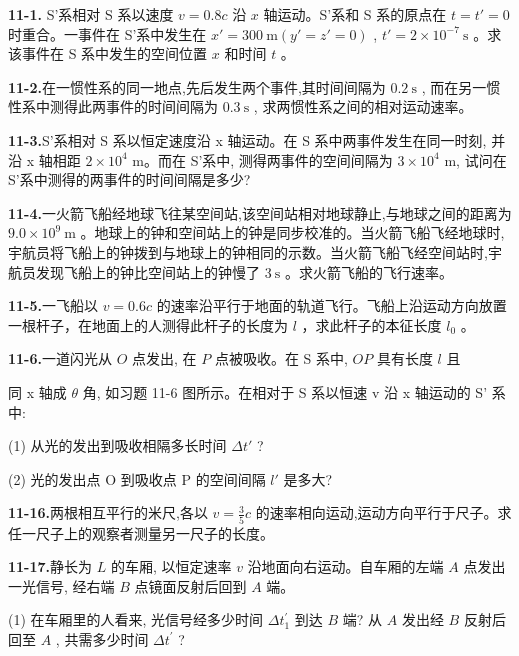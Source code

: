 \textbf{11-1.} S'系相对 S 系以速度 $v = 0.8c$ 沿 $x$ 轴运动。S'系和 S 系的原点在 $t = t' = 0$ 时重合。一事件在 S'系中发生在 $x' = 300 \mathrm{~m} (y' = z' = 0)$ , $t' = 2 \times 10^{-7} \mathrm{~s}$ 。求该事件在 S 系中发生的空间位置 $x$ 和时间 $t$ 。

\vfill

\textbf{11-2.}在一惯性系的同一地点,先后发生两个事件,其时间间隔为 $0.2 \mathrm{~s}$ , 而在另一惯性系中测得此两事件的时间间隔为 $0.3 \mathrm{~s}$ , 求两惯性系之间的相对运动速率。

\vfill
\newpage

\textbf{11-3.}S'系相对 S 系以恒定速度沿 x 轴运动。在 S 系中两事件发生在同一时刻, 并沿 x 轴相距 $2 \times 10^{4}$ m。而在 S'系中, 测得两事件的空间间隔为 $3 \times 10^{4}$ m, 试问在 S'系中测得的两事件的时间间隔是多少?

\vfill

\textbf{11-4.}一火箭飞船经地球飞往某空间站,该空间站相对地球静止,与地球之间的距离为 $9.0 \times 10^{9} \mathrm{~m}$ 。地球上的钟和空间站上的钟是同步校准的。当火箭飞船飞经地球时,宇航员将飞船上的钟拨到与地球上的钟相同的示数。当火箭飞船飞经空间站时,宇航员发现飞船上的钟比空间站上的钟慢了 $3 \mathrm{~s}$ 。求火箭飞船的飞行速率。

\vfill
\newpage

\textbf{11-5.}一飞船以 $v = 0.6c$ 的速率沿平行于地面的轨道飞行。飞船上沿运动方向放置一根杆子，在地面上的人测得此杆子的长度为 $l$ ，求此杆子的本征长度 $l_{0}$ 。

\vfill

\textbf{11-6.}一道闪光从 $O$ 点发出, 在 $P$ 点被吸收。在 S 系中, $OP$ 具有长度 $l$ 且

同 x 轴成 $\theta$ 角, 如习题 11-6 图所示。在相对于 S 系以恒速 v 沿 x 轴运动的 S' 系中:

(1) 从光的发出到吸收相隔多长时间 $\Delta t'$ ?

(2) 光的发出点 O 到吸收点 P 的空间间隔 $l'$ 是多大?

\vfill
\newpage

\textbf{11-16.}两根相互平行的米尺,各以 $v = \frac{3}{5} c$ 的速率相向运动,运动方向平行于尺子。求任一尺子上的观察者测量另一尺子的长度。

\vfill


\textbf{11-17.}静长为 $L$ 的车厢, 以恒定速率 $v$ 沿地面向右运动。自车厢的左端 $A$ 点发出一光信号, 经右端 $B$ 点镜面反射后回到 $A$ 端。

(1) 在车厢里的人看来, 光信号经多少时间 $\Delta t_{1}^{\prime}$ 到达 $B$ 端? 从 $A$ 发出经 $B$ 反射后回至 $A$ , 共需多少时间 $\Delta t^{\prime}$ ?


